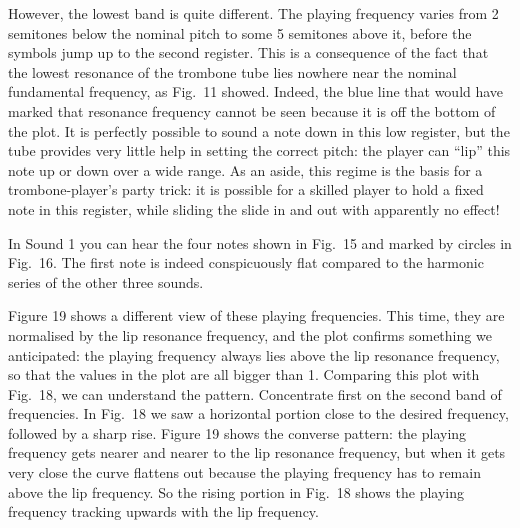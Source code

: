 
  However, the lowest band is quite different. The playing frequency varies 
  from 2 semitones below the nominal pitch to some 5 semitones above it, before 
  the symbols jump up to the second register. This is a consequence of the fact 
  that the lowest resonance of the trombone tube lies nowhere near the nominal 
  fundamental frequency, as Fig.\ 11 showed. Indeed, the blue line that would 
  have marked that resonance frequency cannot be seen because it is off the 
  bottom of the plot. It is perfectly possible to sound a note down in this low 
  register, but the tube provides very little help in setting the correct 
  pitch: the player can “lip” this note up or down over a wide range. As an 
  aside, this regime is the basis for a trombone-player’s party trick: it is 
  possible for a skilled player to hold a fixed note in this register, while 
  sliding the slide in and out with apparently no effect! 

  In Sound 1 you can hear the four notes shown in Fig.\ 15 and marked by 
  circles in Fig.\ 16. The first note is indeed conspicuously flat compared to 
  the harmonic series of the other three sounds. 


  Figure 19 shows a different view of these playing frequencies. This time, 
  they are normalised by the lip resonance frequency, and the plot confirms 
  something we anticipated: the playing frequency always lies above the lip 
  resonance frequency, so that the values in the plot are all bigger than 1. 
  Comparing this plot with Fig.\ 18, we can understand the pattern. Concentrate 
  first on the second band of frequencies. In Fig.\ 18 we saw a horizontal 
  portion close to the desired frequency, followed by a sharp rise. Figure 19 
  shows the converse pattern: the playing frequency gets nearer and nearer to 
  the lip resonance frequency, but when it gets very close the curve flattens 
  out because the playing frequency has to remain above the lip frequency. So 
  the rising portion in Fig.\ 18 shows the playing frequency tracking upwards 
  with the lip frequency. 

